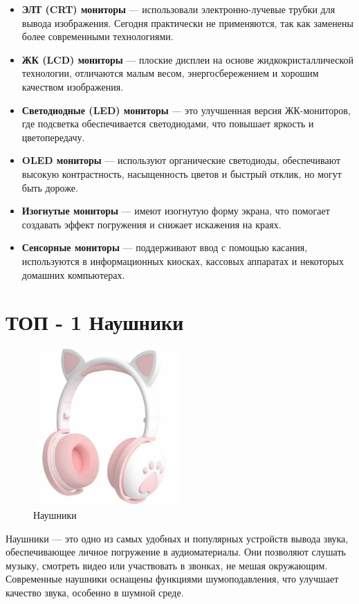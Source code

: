\documentclass[14pt]{extreport}
\begin{document}
    \begin{itemize}
        \item \textbf{ЭЛТ (CRT) мониторы} — использовали электронно-лучевые трубки для вывода изображения. Сегодня практически не применяются, так как заменены более современными технологиями.
        \item \textbf{ЖК (LCD) мониторы} — плоские дисплеи на основе жидкокристаллической технологии, отличаются малым весом, энергосбережением и хорошим качеством изображения.
        \item \textbf{Светодиодные (LED) мониторы} — это улучшенная версия ЖК-мониторов, где подсветка обеспечивается светодиодами, что повышает яркость и цветопередачу.
        \item \textbf{OLED мониторы} — используют органические светодиоды, обеспечивают высокую контрастность, насыщенность цветов и быстрый отклик, но могут быть дороже.
        \item \textbf{Изогнутые мониторы} — имеют изогнутую форму экрана, что помогает создавать эффект погружения и снижает искажения на краях.
        \item \textbf{Сенсорные мониторы} — поддерживают ввод с помощью касания, используются в информационных киосках, кассовых аппаратах и некоторых домашних компьютерах.
    \end{itemize}

    \section{ТОП - 1 Наушники}
    \begin{figure}[h]
        \centering
        \includegraphics[width=0.5\textwidth]{nayshniki.png}
        \caption{Наушники}
        \label{fig:example1}
    \end{figure}
    Наушники — это одно из самых удобных и популярных устройств вывода звука, обеспечивающее личное погружение в аудиоматериалы. Они позволяют слушать музыку, смотреть видео или участвовать в звонках, не мешая окружающим. Современные наушники оснащены функциями шумоподавления, что улучшает качество звука, особенно в шумной среде.
    
\end{document}
